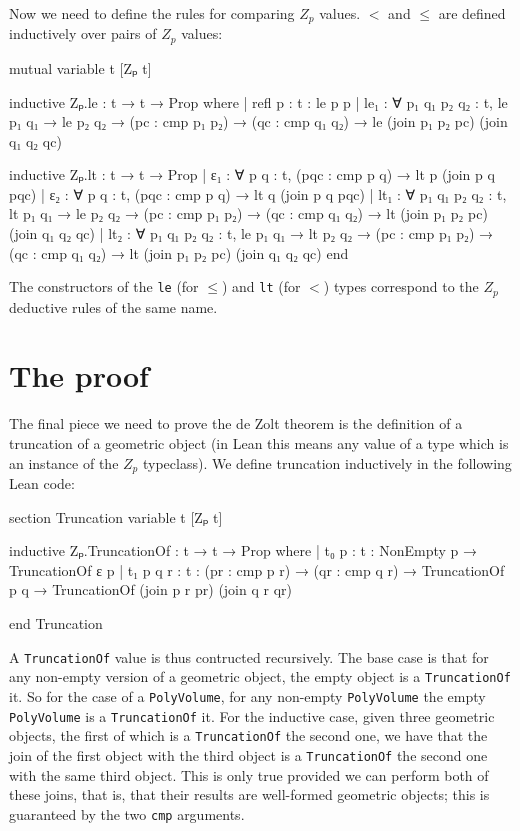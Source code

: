 \documentclass[12pt]{article} %
\newcommand{\leanline}[1]{\texttt{#1}} %
\newcommand{\pvolume}{\texttt{PolyVolume}} %
\newcommand{\truncof}{\texttt{TruncationOf}} %
\newcommand{\zp}{\ensuremath{Z_{p}}}
\begin{document}
Now we need to define the rules for comparing \zp{} values. %
\(<\) and \(\leq\) are defined inductively over pairs of \zp{} values: %
\begin{leancode}
mutual
  variable {t} [Zₚ t]

  inductive Zₚ.le : t → t → Prop where
  | refl {p : t} : le p p
  | le₁ : ∀ {p₁ q₁ p₂ q₂ : t}, le p₁ q₁ → le p₂ q₂
        → (pc : cmp p₁ p₂) → (qc : cmp q₁ q₂)
        → le (join p₁ p₂ pc) (join q₁ q₂ qc)

  inductive Zₚ.lt : t → t → Prop
  | ε₁ : ∀ {p q : t}, (pqc : cmp p q) → lt p (join p q pqc)
  | ε₂ : ∀ {p q : t}, (pqc : cmp p q) → lt q (join p q pqc)
  | lt₁ : ∀ {p₁ q₁ p₂ q₂ : t}, lt p₁ q₁ → le p₂ q₂
        → (pc : cmp p₁ p₂) → (qc : cmp q₁ q₂)
        → lt (join p₁ p₂ pc) (join q₁ q₂ qc)
  | lt₂ : ∀ {p₁ q₁ p₂ q₂ : t}, le p₁ q₁ → lt p₂ q₂
        → (pc : cmp p₁ p₂) → (qc : cmp q₁ q₂)
        → lt (join p₁ p₂ pc) (join q₁ q₂ qc)
end
\end{leancode}
The constructors of the \leanline{le} (for \(\leq\)) and \leanline{lt} (for \(<\)) types correspond to the \zp{} deductive rules of the same name. %

\section{The proof}\label{sec:de-zolt-theorem} %

The final piece we need to prove the de Zolt theorem is the definition of a truncation of a geometric object (in Lean this means any value of a type which is an instance of the \zp{} typeclass). %
We define truncation inductively in the following Lean code: %
\begin{leancode}
section Truncation
variable {t} [Zₚ t]

inductive Zₚ.TruncationOf : t → t → Prop where
| t₀ {p : t} : NonEmpty p → TruncationOf ε p
| t₁ {p q r : t} : (pr : cmp p r) → (qr : cmp q r)
    → TruncationOf p q
    → TruncationOf (join p r pr) (join q r qr)

end Truncation
\end{leancode}

A \truncof{} value is thus contructed recursively. %
The base case is that for any non-empty version of a geometric object, the empty object is a \truncof{} it. %
So for the case of a \pvolume, for any non-empty \pvolume{} the empty \pvolume{} is a \truncof{} it. %
For the inductive case, given three geometric objects, the first of which is a \truncof{} the second one, we have that the join of the first object with the third object is a \truncof{} the second one with the same third object. %
This is only true provided we can perform both of these joins, that is, that their results are well-formed geometric objects; this is guaranteed by the two \leanline{cmp} arguments. %
\end{document}
